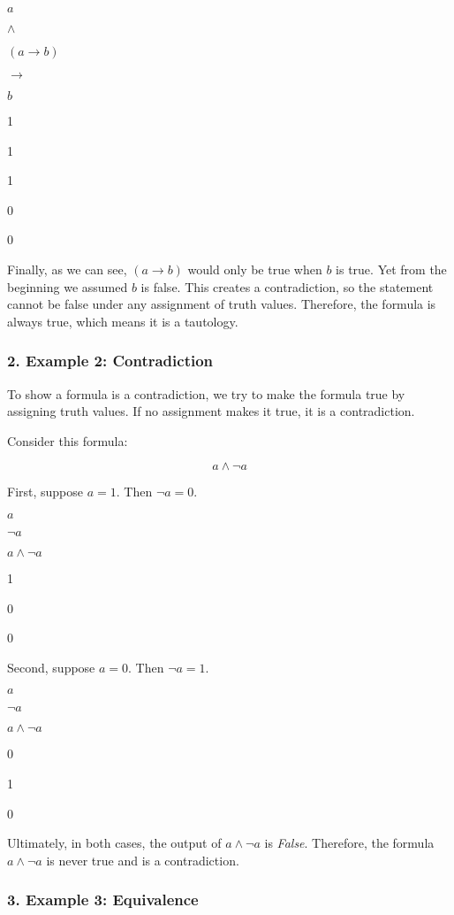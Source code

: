 \(a\)

\(\land\)

\((a \rightarrow b)\)

\(\rightarrow\)

\(b\)

1

1

1

0

0

Finally, as we can see, \((a \rightarrow b)\) would only be true when
\(b\) is true. Yet from the beginning we assumed \(b\) is false. This
creates a contradiction, so the statement cannot be false under any
assignment of truth values. Therefore, the formula is always true, which
means it is a tautology.

\subsubsection{2. Example 2:
Contradiction}\label{example-2-contradiction}

To show a formula is a contradiction, we try to make the formula true by
assigning truth values. If no assignment makes it true, it is a
contradiction.

Consider this formula:

\[ a \land \neg a \]

First, suppose \(a = 1\). Then \(\neg a = 0\).

\(a\)

\(\neg a\)

\(a \land \neg a\)

1

0

0

Second, suppose \(a = 0\). Then \(\neg a = 1\).

\(a\)

\(\neg a\)

\(a \land \neg a\)

0

1

0

Ultimately, in both cases, the output of \(a \land \neg a\) is
\emph{False}. Therefore, the formula \(a \land \neg a\) is never true
and is a contradiction.

\subsubsection{3. Example 3: Equivalence}\label{example-3-equivalence}

